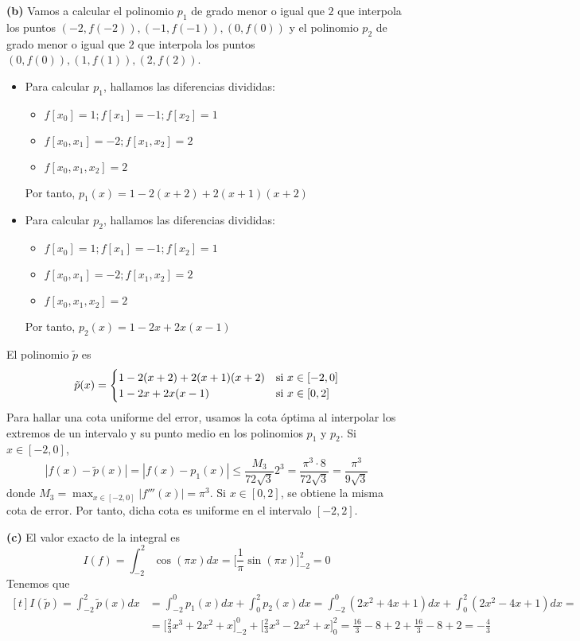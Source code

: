 \documentclass[12pt]{report}
\begin{document}
\textbf{(b)} Vamos a calcular el polinomio $p_1$ de grado menor o igual que $2$ que interpola los puntos $(-2,f(-2)),(-1,f(-1)),(0,f(0))$ y el polinomio $p_2$ de grado menor o igual que $2$ que interpola los puntos $(0,f(0)),(1,f(1)),(2,f(2))$.
\begin{itemize}
    \item Para calcular $p_1$, hallamos las diferencias divididas:
    \begin{itemize}
        \item $f[x_0] = 1; f[x_1] = -1; f[x_2] = 1$
        \item $f[x_0,x_1] = -2; f[x_1,x_2] = 2$
        \item $f[x_0,x_1,x_2] = 2$
    \end{itemize}
    Por tanto, $p_1(x) = 1 -2(x+2) + 2(x+1)(x+2)$
    \item Para calcular $p_2$, hallamos las diferencias divididas:
    \begin{itemize}
        \item $f[x_0] = 1; f[x_1] = -1; f[x_2] = 1$
        \item $f[x_0,x_1] = -2; f[x_1,x_2] = 2$
        \item $f[x_0,x_1,x_2] = 2$
    \end{itemize}
    Por tanto, $p_2(x) = 1 -2x + 2x(x-1)$
\end{itemize}
El polinomio $\tilde{p}$ es 
\[\tilde{p}(x) = 
\begin{cases}
1 -2(x+2) + 2(x+1)(x+2) & $si$ \ x \in [-2,0] \\
1 -2x + 2x(x-1) & $si$ \ x \in [0,2]
\end{cases}\]
Para hallar una cota uniforme del error, usamos la cota óptima al interpolar los extremos de un intervalo y su punto medio en los polinomios $p_1$ y $p_2$. Si $x \in [-2,0]$,
\[|f(x) - \tilde{p}(x)| = |f(x) - p_1(x)| \leq \frac{M_3}{72\sqrt{3}}2^3 = \frac{\pi^3 \cdot 8}{72 \sqrt{3}} = \frac{\pi^3}{9\sqrt{3}}\]
donde $\displaystyle M_3 = \max_{x \in [-2,0]} |f'''(x)| = \pi^3$. Si $x \in [0,2]$, se obtiene la misma cota de error. Por tanto, dicha cota es uniforme en el intervalo $[-2,2]$.

\vspace{2mm}
\textbf{(c)} El valor exacto de la integral es
\[I(f) = \int_{-2}^2 \cos{(\pi x)}dx = \Biggl[ \frac{1}{\pi}\sin{(\pi x)} \Biggr]_{-2}^2 = 0\]
Tenemos que
\[
\begin{aligned}[t]
I(\tilde{p}) = \int_{-2}^2 \tilde{p}(x)dx &= \int_{-2}^0 p_1(x)dx + \int_0^2 p_2(x)dx = \int_{-2}^0 (2x^2 +4x+1)dx + \int_0^2 (2x^2-4x+1)dx = \\
&= \Biggl[ \frac{2}{3}x^3 + 2x^2 + x\Biggr]_{-2}^0 + \Biggl[ \frac{2}{3}x^3 - 2x^2 + x\Biggr]_{0}^2 = \frac{16}{3}-8+2 + \frac{16}{3}-8+2 = -\frac{4}{3}
\end{aligned}
\]
\end{document}
